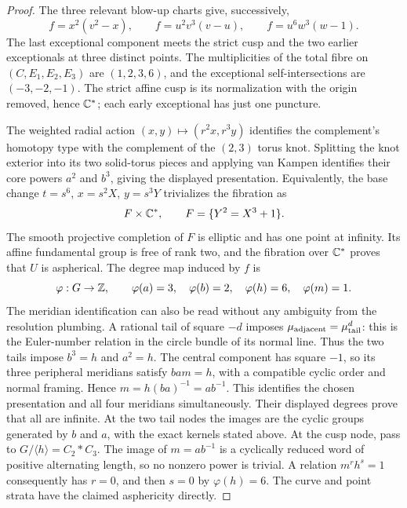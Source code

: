 \begin{proof}
The three relevant blow-up charts give, successively,
\[
 f=x^2(v^2-x),\qquad
 f=u^2v^3(v-u),\qquad
 f=u^6w^3(w-1).
\]
The last exceptional component meets the strict cusp and the two
earlier exceptionals at three distinct points. The multiplicities
of the total fibre on $(C,E_1,E_2,E_3)$ are $(1,2,3,6)$, and the
exceptional self-intersections are $(-3,-2,-1)$. The strict affine
cusp is its normalization with the origin removed, hence $\mathbb C^*$;
each early exceptional has just one puncture.

The weighted radial action $(x,y)\mapsto(r^2x,r^3y)$ identifies the
complement's homotopy type with the complement of the $(2,3)$ torus
knot. Splitting the knot exterior into its two solid-torus pieces
and applying van Kampen identifies their core powers $a^2$ and
$b^3$, giving the displayed presentation. Equivalently, the base
change $t=s^6$, $x=s^2X$, $y=s^3Y$ trivializes the fibration as
\[
 F\times\mathbb C^*,\qquad F=\{Y^2=X^3+1\}.
\]
The smooth projective completion of $F$ is elliptic and has one
point at infinity. Its affine fundamental group is free of rank
two, and the fibration over $\mathbb C^*$ proves that $U$ is aspherical.
The degree map induced by $f$ is
\[
 \varphi:G\to\mathbb Z,\qquad
 \varphi(a)=3,\quad\varphi(b)=2,\quad\varphi(h)=6,\quad\varphi(m)=1.
\]
The meridian identification can also be read without any ambiguity
from the resolution plumbing. A rational tail of square $-d$ imposes
$\mu_{\rm adjacent}=\mu_{\rm tail}^{d}$: this is the Euler-number
relation in the circle bundle of its normal line. Thus the two tails
impose $b^3=h$ and $a^2=h$. The central component has square $-1$,
so its three peripheral meridians satisfy $bam=h$, with a compatible
cyclic order and normal framing. Hence $m=h(ba)^{-1}=ab^{-1}$.
This identifies the chosen presentation and all four meridians
simultaneously. Their displayed degrees prove that all are infinite.
At the two tail nodes the images are the cyclic groups generated by
$b$ and $a$, with the exact kernels stated above. At the cusp node,
pass to $G/\langle h\rangle=C_2*C_3$. The image of $m=ab^{-1}$ is a
cyclically reduced word of positive alternating length, so no
nonzero power is trivial. A relation $m^rh^s=1$ consequently has
$r=0$, and then $s=0$ by $\varphi(h)=6$. The curve and point
strata have the claimed asphericity directly.
\end{proof}

